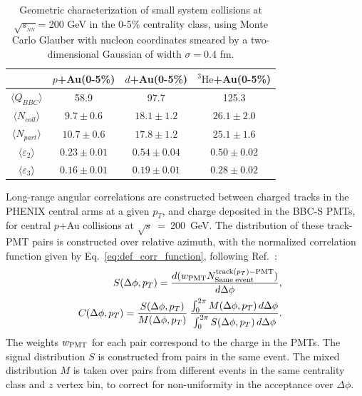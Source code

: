 \documentclass[%
reprint,
showpacs,preprintnumbers,
 amsmath,amssymb,
 aps,
]{revtex4-1}
\newcommand{\pt}{\mbox{$p_T$}\xspace}
\newcommand{\sqs}{\mbox{$\sqrt{s}$}\xspace}
\newcommand{\sqsn}{\mbox{$\sqrt{s_{_{NN}}}$}\xspace}
\newcommand{\dau}{\mbox{$d$+Au}\xspace}
\newcommand{\pau}{\mbox{$p$+Au}\xspace}
\newcommand{\hau}{\mbox{$^3\text{He}$+Au}\xspace}
\begin{document}
\begin{table}
\caption{Geometric characterization of small system collisions at \sqsn = 200 GeV in the 0-5\% centrality class, using Monte Carlo Glauber with nucleon coordinates smeared by a two-dimensional Gaussian of width $\sigma=0.4$ fm.}
\begin{ruledtabular}
\begin{tabular}{c c c c}
\label{table_geometry}
 & \pau (0-5\%) & \dau (0-5\%) & \hau (0-5\%) \\
\hline
 $\langle Q_{BBC} \rangle$ & 58.9 & 97.7 & 125.3 \\
 $\langle N_{coll} \rangle$ & $9.7\pm 0.6$ & $18.1\pm 1.2$ & $26.1\pm 2.0$ \\
 $\langle N_{part} \rangle$ & $10.7\pm 0.6$ & $17.8\pm 1.2$ & $25.1\pm  1.6$ \\ 
 $\langle \varepsilon_2 \rangle$ & $0.23\pm 0.01$ & $0.54\pm 0.04$ & $0.50\pm 0.02$ \\
 $\langle \varepsilon_3 \rangle$ & $0.16\pm 0.01$ & $0.19\pm 0.01$ & $0.28\pm 0.02$
\end{tabular}
\end{ruledtabular}
\end{table}

Long-range angular correlations are constructed between charged tracks in the PHENIX central arms at a given \pt, and charge deposited in the BBC-S PMTs, for central \pau collisions at \sqs~=~200~GeV. The distribution of these track-PMT pairs is constructed over relative azimuth, with the normalized correlation function given by Eq.~\ref{eq:def_corr_function}, following Ref.~\cite{PhysRevLett.115.142301}:
\begin{eqnarray}
  S(\Delta\phi,p_{T})=
  \frac{ d(w_{{\rm PMT}} N^{{\rm track}(p_{T}){\rm - PMT}}_{{\rm Same \; event}}) }{ d\Delta\phi}, & &
\label{eq31} \\
  C(\Delta\phi,p_{T}) =
          \frac{S(\Delta\phi,p_{T})}{M(\Delta\phi,p_{T})} \:
          \frac{\int_{0}^{2\pi} M(\Delta\phi,p_{T}) \, d\Delta\phi}{\int_{0}^{2\pi} S(\Delta\phi,p_{T}) \, d\Delta\phi}. & &
  \label{eq:def_corr_function}
\end{eqnarray}
The weights $w_{{\rm PMT}}$ for each pair correspond to the charge in the PMTs. The signal distribution $S$ is constructed from pairs in the same event. The mixed distribution $M$ is taken over pairs from different events in the same centrality class and $z$ vertex bin, to correct for non-uniformity in the acceptance over $\Delta \phi$.
\end{document}
